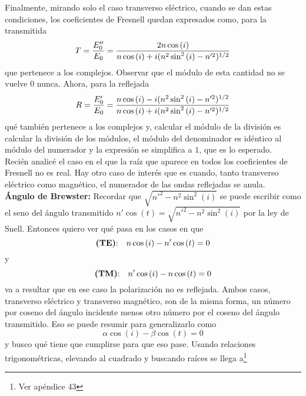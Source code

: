 \indent Finalmente, mirando solo el caso transverso eléctrico, cuando se dan estas condiciones, los coeficientes de Fresnell quedan expresados como, para la transmitida
\begin{equation*}
    T = \frac{E_{0}''}{E_{0}} = 
    \frac%
        {%
            2n\cos{(i)}
        }
        {%
            n\cos{(i)}
            +
            i(n^{2}\sin^{2}{(i)} - n'^{2})^{1/2}
        }
\end{equation*}
que pertenece a los complejos. Observar que el módulo de esta cantidad no se vuelve 0 nunca. Ahora, para la reflejada
\begin{equation*}
    R = \frac{E_{0}'}{E_{0}} = 
    \frac%
        {%
            n\cos{(i)}
            -
            i(n^{2}\sin^{2}{(i)} - n'^{2})^{1/2}
        }
        {%
            n\cos{(i)}
            +
            i(n^{2}\sin^{2}{(i)} - n'^{2})^{1/2}
        }
\end{equation*}
qué también pertenece a los complejos y, calcular el módulo de la división es calcular la división de los módulos, el módulo del denominador es idéntico al módulo del numerador y la expresión se simplifica a $1$, que es lo esperado.\\
\indent Recién analicé el caso en el que la raíz que aparece en todos los coeficientes de Fresnell no es real. Hay otro caso de interés que es cuando, tanto transverso eléctrico como magnético, el numerador de las ondas reflejadas se anula.\\
\indent \textbf{Ángulo de Brewster:}  Recordar que $\sqrt{n'^{2} - n^{2}\sin^{2}{(i)}}$ se puede escribir como el seno del ángulo transmitido $n'\cos{(t)} = \sqrt{n'^{2} - n^{2}\sin^{2}{(i)}}$ por la ley de Snell. Entonces quiero ver qué pasa en los casos en que
\begin{equation*}
    \mbox{\textbf{(TE)}:}\quad
    n\cos{(i)} - n'\cos{(t)} = 0
\end{equation*}
y
\begin{equation*}
    \mbox{\textbf{(TM)}:}\quad
    n'\cos{(i)} - n\cos{(t)} = 0
\end{equation*}
va a resultar que en ese caso la polarización no es reflejada. Ambos casos, transverso eléctrico y transverso magnético, son de la misma forma, un número por coseno del ángulo incidente menos otro número por el coseno del ángulo transmitido. Eso se puede resumir para generalizarlo como 
\begin{equation*}
    \alpha \cos{(i)} - \beta\cos{(t)} = 0
\end{equation*}
y busco qué tiene que cumplirse para que eso pase. Usando relaciones trigonométricas, elevando al cuadrado y buscando raíces se llega a\footnote{Ver apéndice 43}
